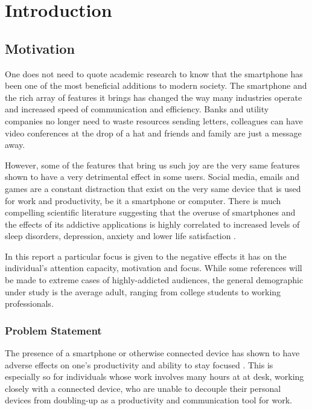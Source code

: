 \chapter{Introduction}

\section{Motivation}
One does not need to quote academic research to know that the smartphone has been one of the most beneficial additions to modern society. The smartphone and the rich array of features it brings has changed the way many industries operate and increased speed of communication and efficiency. Banks and utility companies no longer need to waste resources sending letters, colleagues can have video conferences at the drop of a hat and friends and family are just a message away.

However, some of the features that bring us such joy are the very same features shown to have a very detrimental effect in some users. Social media, emails and games are a constant distraction that exist on the very same device that is used for work and productivity, be it a smartphone or computer. There is much compelling scientific literature suggesting that the overuse of smartphones and the effects of its addictive applications is highly correlated to increased levels of sleep disorders, depression, anxiety and lower life satisfaction \cite{abi2020smartphones, lee2014hooked, demirci2015relationship}.

In this report a particular focus is given to the negative effects it has on the individual's attention capacity, motivation and focus. While some references will be made to extreme cases of highly-addicted audiences, the general demographic under study is the average adult, ranging from college students to working professionals.

\subsection{Problem Statement}
The presence of a smartphone or otherwise connected device has shown to have adverse effects on one's productivity and ability to stay focused \cite{thornton2014mere}. This is especially so for individuals whose work involves many hours at at desk, working closely with a connected device, who are unable to decouple their personal devices from doubling-up as a productivity and communication tool for work.

